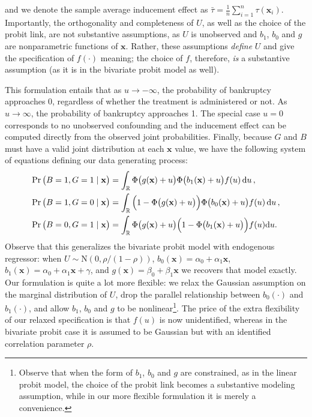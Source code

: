 \documentclass[aoas,preprint, 11pt, dvipsnames, table, x11name]{imsart}
\renewcommand{\bm}[1]{\mathbf{#1}}
\theoremstyle{remark}
\begin{document}
and we denote the sample average inducement effect as $\bar{\tau} = \frac{1}{n}\sum_{i=1}^{n}\tau(\mathbf{x}_i)$. Importantly, the orthogonality and completeness of $U$, as well as the choice of the probit link, are not substantive assumptions, as $U$ is unobserved and $b_1$, $b_0$ and $g$ are nonparametric functions of $\mathbf{x}$. Rather, these assumptions {\em define} $U$ and give the specification of $f(\cdot)$ meaning; the choice of $f$, therefore, {\em is} a substantive assumption (as it is in the bivariate probit model as well).







 This formulation entails that as $u\rightarrow -\infty$, the probability of bankruptcy approaches 0, regardless of whether the treatment is administered or not. As $u\rightarrow \infty$, the probability of bankruptcy approaches 1.  The special case $u=0$ corresponds to no unobserved confounding and the inducement effect can be computed directly from the observed joint probabilities.      	
Finally, because $G$ and $B$ must have a valid joint distribution at each $\mathbf{x}$ value, we have the following system of equations defining our data generating process:
\begin{equation}
    \begin{split}
	\Pr\qty(B=1, G=1\mid \bm{x})&= \int_{\mathbb{R}} \Phi\qty(g(\bm{x})+u)\Phi\qty(b_1(\bm{x})+u)f(u)\dd{u},\\
	\Pr\qty(B=1, G=0\mid \bm{x})&=\int_{\mathbb{R}} \qty(1-\Phi\qty(g(\bm{x})+u))\Phi\qty(b_0(\bm{x})+u)f(u)\dd{u},\\
	\Pr\qty(B=0, G=1\mid \bm{x})&=\int_{\mathbb{R}}\Phi\qty(g(\bm{x})+u)\qty(1-\Phi\qty(b_1(\bm{x})+u))f(u)\dd u.
	\label{long}
\end{split}
\end{equation}
Observe that this generalizes the bivariate probit model with endogenous regressor: when $U \sim \mbox{N}(0, \rho/(1-\rho))$,  $b_0(\mathbf{x}) = \alpha_0 + \alpha_1 \mathbf{x}$, $b_1(\mathbf{x}) = \alpha_0 + \alpha_1 \mathbf{x} + \gamma$, and $g(\mathbf{x}) = \beta_0 + \beta_1 \mathbf{x}$ we recovers that model exactly.	Our formulation is quite a lot more flexible: we relax the Gaussian assumption on the marginal distribution of $U$, drop the parallel relationship between $b_0(\cdot)$ and $b_1(\cdot)$, and allow $b_1$, $b_0$ and $g$ to be nonlinear\footnote{Observe that when the form of $b_1$, $b_0$ and $g$ are constrained, as in the linear probit model, the choice of the probit link becomes a substantive modeling assumption, while in our more flexible formulation it is merely a convenience.}. The price of the extra flexibility of our relaxed specification is that $f(u)$ is now unidentified, whereas in the bivariate probit case it is assumed to be Gaussian but with an identified correlation parameter $\rho$. 
	
\end{document}
